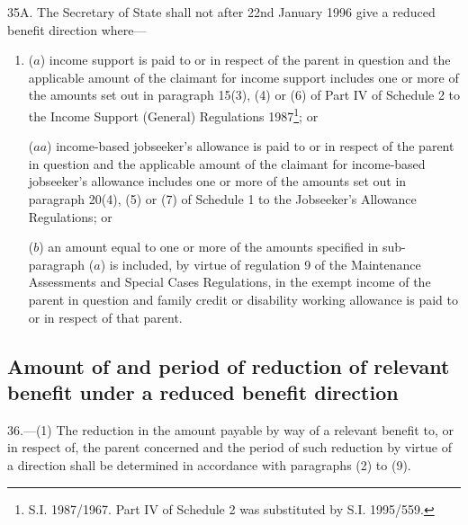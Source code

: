 \documentclass[a4paper,12pt]{article}
\begin{document}
35A.  
The Secretary of State  %
shall not after 22nd January 1996 give a reduced benefit direction where—
\begin{enumerate}\item[]
($a$) income support is paid to or in respect of the parent in question and the applicable amount of the claimant for income support includes one or more of the amounts set out in paragraph 15(3), (4) or (6) of Part IV of Schedule 2 to the Income Support (General) Regulations 1987\footnote{\frenchspacing S.I. 1987/1967. Part IV of Schedule 2 was substituted by S.I. 1995/559.}; or

($aa$) income-based jobseeker’s allowance is paid to or in respect of the parent in question and the applicable amount of the claimant for income-based jobseeker’s allowance includes one or more of the amounts set out in paragraph 20(4), (5) or (7) of Schedule 1 to the Jobseeker’s Allowance Regulations; or

($b$) an amount equal to one or more of the amounts specified in sub-paragraph ($a$) is included, by virtue of regulation 9 of the Maintenance Assessments and Special Cases Regulations, in the exempt income of the parent in question and family credit or disability working allowance is paid to or in respect of that parent.
\end{enumerate}


\subsection[36. Amount of and period of reduction of relevant benefit under a reduced benefit direction]{Amount of and period of reduction of relevant benefit under a reduced benefit direction}

36.—(1) The reduction in the amount payable by way of a relevant benefit to, or in respect of, the parent concerned and the period of such reduction by virtue of a direction shall be determined in accordance with paragraphs (2) to (9).
\end{document}
